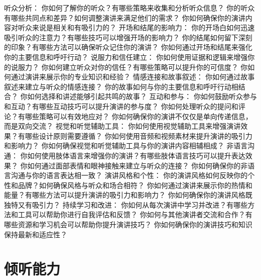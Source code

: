 \documentclass[12pt]{book}
\begin{document}
听众分析：
你如何了解你的听众？有哪些策略来收集和分析听众信息？
你的听众有哪些共同点和差异？如何调整演讲来满足他们的需求？
你如何确保你的演讲内容对听众来说是相关和有吸引力的？
开场和结尾的影响力：
你的开场白如何迅速吸引听众的注意力？有哪些技巧可以增强开场的影响力？
你的结尾如何留下深刻的印象？有哪些方法可以确保听众记住你的演讲？
你如何通过开场和结尾来强化你的主要信息和呼吁行动？
说服力和信任建立：
你如何使用证据和逻辑来增强你的说服力？
你如何建立听众对你的信任？有哪些策略可以提升你的可信度？
你如何通过演讲来展示你的专业知识和经验？
情感连接和故事叙述：
你如何通过故事叙述来建立与听众的情感连接？
你的故事如何与你的主要信息和呼吁行动相结合？
你如何选择和讲述能够引起共鸣的故事？
互动和参与：
你如何鼓励听众参与和互动？有哪些互动技巧可以提升演讲的参与度？
你如何处理听众的提问和评论？有哪些策略可以有效地应对？
你如何确保你的演讲不仅仅是单向传递信息，而是双向交流？
视觉和听觉辅助工具：
你如何使用视觉辅助工具来增强演讲效果？有哪些设计原则需要遵循？
你如何使用音频和视频素材来提升演讲的吸引力和影响力？
你如何确保视觉和听觉辅助工具与你的演讲内容相辅相成？
非语言沟通：
你如何使用肢体语言来增强你的演讲？有哪些肢体语言技巧可以提升表达效果？
你如何通过面部表情和眼神接触来建立与听众的连接？
你如何确保你的非语言沟通与你的语言表达相一致？
演讲风格和个性：
你的演讲风格如何反映你的个性和品牌？如何确保风格与听众和场合相符？
你如何通过演讲来展示你的热情和能量？有哪些方法可以提升演讲的吸引力和影响力？
你如何确保你的演讲风格既独特又有吸引力？
持续学习和改进：
你如何从每次演讲中学习并改进？有哪些方法和工具可以帮助你进行自我评估和反馈？
你如何与其他演讲者交流和合作？有哪些资源和学习机会可以帮助你提升演讲技巧？
你如何确保你的演讲技巧和知识保持最新和适应性？


\section{倾听能力}
\end{document}

